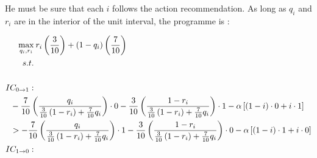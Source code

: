 He must be sure that each \( i \) follows the action recommendation. As long as \(q_i\) and \( r_i \) are in the interior of the unit interval, the programme is :

\begin{align*}
	\max_{q_i, r_i}       & \: r_i \left( \frac{3}{10} \right) + \left( 1 - q_i \right)\left( \frac{7}{10} \right)                                                                                                                                                                                                                                                                                                              \\                                                                               s.t. &  \\                                                                                                                                                                                                              \\
	IC_{0 \rightarrow 1}: &                                                                                                                                                                                                                                                                                                                                                                                                     \\
	                      & \hspace{-1cm} - \frac{7}{10}             \left( \frac{q_i}{\frac{3}{10} \left( 1 - r_i \right) + \frac{7}{10} q_i} \right)                                              \cdot 0 -            \frac{3}{10}             \left( \frac{1 - r_i}{\frac{3}{10} \left( 1 - r_i \right) + \frac{7}{10} q_i } \right)         \cdot 1     - \alpha \left[ \left( 1 - i \right) \cdot 0 + i \cdot 1 \right]   \\
	                      & \hspace{-1cm} > - \frac{7}{10}             \left( \frac{q_i}{\frac{3}{10} \left( 1 - r_i \right) + \frac{7}{10} q_i} \right)                                              \cdot 1 -            \frac{3}{10}             \left( \frac{1 - r_i}{\frac{3}{10} \left( 1 - r_i \right) + \frac{7}{10} q_i } \right)         \cdot 0     - \alpha \left[ \left( 1 - i \right) \cdot 1 + i \cdot 0 \right] \\
	IC_{1 \rightarrow 0}: &                                                                                                                                                                                                                                                                                                                                                                                                     \\

\end{align*}
